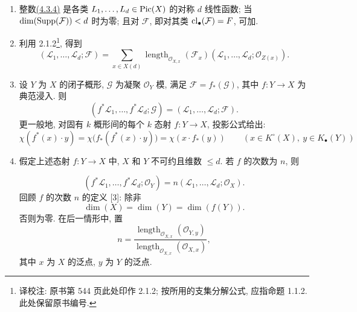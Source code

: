 \begin{enumerate}[label=\arabic*)]
\item 整数\hyperlink{sga6.e10.eq.4-3-4}{(4.3.4)} 是各类 $L_1,\ldots,L_d\in\operatorname{Pic}(X)$ 的对称 $d$ 线性函数; 当 $\dim(\operatorname{Supp}(\mathcal F))<d$ 时为零; 且对 $\mathcal F$, 即对其类 $\operatorname{cl}_\bullet(\mathcal F)=F$, 可加.
%
%
%

\item 利用 2.1.2\footnote{译校注: 原书第 544 页此处印作 2.1.2; 按所用的支集分解公式, 应指命题 1.1.2. 此处保留原书编号.}, 得到
\begin{equation}\tag{4.4.1}
(\mathcal L_1,\ldots,\mathcal L_d;\mathcal F)=
\sum_{x\in X(d)}
\operatorname{length}_{\mathcal O_{X,x}}(\mathcal F_x)
(\mathcal L_1,\ldots,\mathcal L_d;\mathcal O_{Z(x)}).
\end{equation}

\item 设 $Y$ 为 $X$ 的闭子概形, $\mathcal G$ 为凝聚 $\mathcal O_Y$ 模, 满足 $\mathcal F=f_*(\mathcal G)$, 其中 $f:Y\to X$ 为典范浸入. 则
%
%
%
\[
(f^*\mathcal L_1,\ldots,f^*\mathcal L_d;\mathcal G)
=(\mathcal L_1,\ldots,\mathcal L_d;\mathcal F).
\]
更一般地, 对固有 $k$ 概形间的每个 $k$ 态射 $f:Y\to X$, 投影公式给出:
\begin{equation}\tag{4.4.2}
\chi(f^*(x)\cdot y)
=\chi\bigl(f_*(f^*(x)\cdot y)\bigr)
=\chi(x\cdot f_*(y))
\qquad(x\in K^\circ(X),\ y\in K_\bullet(Y))
\end{equation}
%

\item 假定上述态射 $f:Y\to X$ 中, $X$ 和 $Y$ 不可约且维数 $\leq d$. 若 $f$ 的次数为 $n$, 则
%

\begin{equation}\tag{4.4.3}
(f^*\mathcal L_1,\ldots,f^*\mathcal L_d;\mathcal O_Y)
=n(\mathcal L_1,\ldots,\mathcal L_d;\mathcal O_X).
\end{equation}
回顾 $f$ 的次数 $n$ 的定义 [3]: 除非
\[
\dim(X)=\dim(Y)=\dim(f(Y)).
\]
否则为零. 在后一情形中, 置
\begin{equation}\tag{4.4.4}
n=
\frac{\operatorname{length}_{\mathcal O_{X,x}}(\mathcal O_{Y,y})}
{\operatorname{length}_{\mathcal O_{X,x}}(\mathcal O_{X,x})},
\end{equation}
其中 $x$ 为 $X$ 的泛点, $y$ 为 $Y$ 的泛点.
\end{enumerate}

